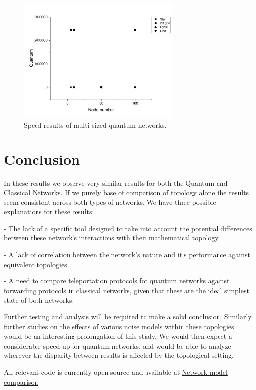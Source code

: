 \documentclass{article}
\begin{document}
    \begin{figure}
    \centering
    \includegraphics[width=8cm]{SQ.png}
    \caption{Speed results of multi-sized quantum networks. \label{f9}} 
    \end{figure}

    \section{Conclusion}
    
In these results we observe very similar results for both the Quantum and Classical Networks. If we purely base of comparison of topology alone the results seem consistent across both types of networks. 
    We have three possible explanations for these results:
    
    - The lack of a specific tool designed to take into account the potential differences between these network's interactions with their mathematical topology.
    
    - A lack of correlation between the network's nature and it's performance against equivalent topologies.
    
    - A need to compare teleportation protocols for quantum networks against forwarding protocols in classical networks, given that these are the ideal simplest state of both networks.
    
    Further testing and analysis will be required to make a solid conclusion.
    Similarly further studies on the effects of various noise models within these topologies would be an interesting prolongation of this study. We would then expect a considerable speed up for quantum networks, and would be able to analyze wherever the disparity between results is affected by the topological setting.
    
    All relevant code is currently open source and available at \href{https://github.com/mgg39/Network-model-comparison}{Network model comparison}
    


    
    
\end{document}
